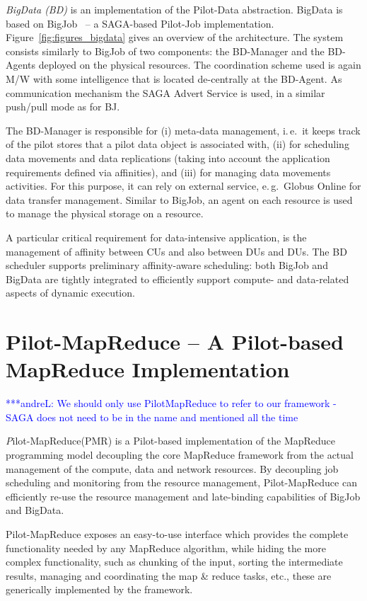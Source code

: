 \documentclass{acm_proc_article-sp}
\newcommand{\alnote}[1]{ {\textcolor{blue} { ***andreL: #1 }}}
\newcommand{\alnote}[1]{}
\newcommand{\pilot}{Pilot\xspace}
\newcommand{\pilotmapreduce}{Pilot-MapReduce\xspace}
\begin{document}
{\it BigData (BD)} is an implementation of the Pilot-Data abstraction.
BigData is based on BigJob~\cite{bigjob_web} -- a SAGA-based Pilot-Job
implementation. Figure~\ref{fig:figures_bigdata} gives an overview of the
architecture. The system consists similarly to BigJob of two components: the
BD-Manager and the BD-Agents deployed on the physical resources. The
coordination scheme used is again M/W with some intelligence that is located
de-centrally at the BD-Agent. As communication mechanism the SAGA Advert
Service is used, in a similar push/pull mode as for BJ.

The BD-Manager is responsible for (i) meta-data management, i.\,e.\ it
keeps track of the pilot stores that a pilot data object is associated
with, (ii) for scheduling data movements and data replications (taking
into account the application requirements defined via affinities), and
(iii) for managing data movements activities. For this purpose, it can rely
on external service, e.\,g.\ Globus Online for data transfer management.  
Similar to BigJob, an agent on each resource is used to manage the physical 
storage on a resource.  

A particular critical requirement for data-intensive application, is
the management of affinity between CUs and also between DUs and
DUs. The BD scheduler supports preliminary affinity-aware
scheduling: both BigJob and BigData are tightly integrated to
efficiently support compute- and data-related aspects of dynamic
execution.


\section{Pilot-MapReduce -- A Pilot-based MapReduce Implementation}
\alnote{We should only use PilotMapReduce to refer to our framework - SAGA does not need to be in the name and mentioned all the time}


{\emph \pilotmapreduce (PMR)} is a \pilot-based implementation of the 
MapReduce programming model decoupling the core MapReduce framework from the 
actual management of the compute, data and network resources. By decoupling 
job scheduling and monitoring from the resource management, \pilotmapreduce 
can efficiently re-use the resource management and late-binding capabilities 
of BigJob and BigData.

\pilotmapreduce exposes an easy-to-use interface which provides the complete
functionality needed by any MapReduce algorithm, while hiding the more complex
functionality, such as chunking of the input, sorting the intermediate
results, managing and coordinating the map \& reduce tasks, etc., these are generically
implemented by the framework.
\end{document}
